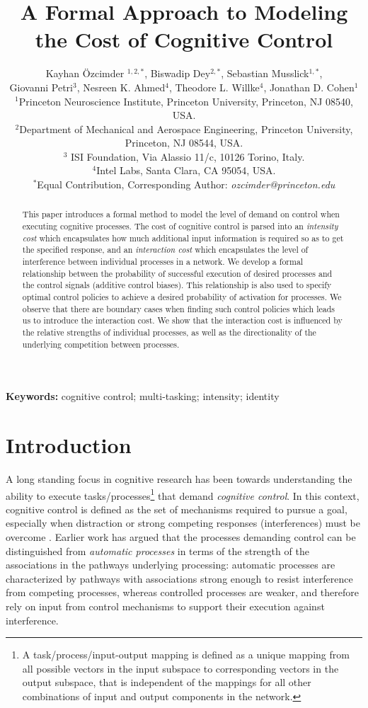 \documentclass[10pt,letterpaper]{article}
\title{A Formal Approach to Modeling the Cost of Cognitive Control}
\author{
Kayhan {\"O}zcimder $^{1,2,*}$, Biswadip Dey$^{2,*}$, Sebastian Musslick$^{1,*}$, \\ 
Giovanni Petri$^3$, Nesreen K. Ahmed$^4$, Theodore L. Willke$^4$, Jonathan D. Cohen$^1$ \\
  $^1$Princeton Neuroscience Institute, Princeton University, Princeton, NJ 08540, USA. \\
  $^2$Department of Mechanical and Aerospace Engineering, Princeton University, Princeton, NJ 08544, USA. \\
  $^3$ ISI Foundation, Via Alassio 11/c, 10126 Torino, Italy.\\
  $^4$Intel Labs, Santa Clara, CA 95054, USA.\\
  $^*$Equal Contribution, Corresponding Author: {\it ozcimder@princeton.edu}
}
\begin{document}
\maketitle

\begin{abstract}
This paper introduces a formal method to model the level of demand on control when executing cognitive processes. The cost of cognitive control is parsed into an \emph{intensity cost} which encapsulates how much additional input information is required so as to get the specified response, and an \emph{interaction cost} which encapsulates the level of interference between individual processes in a network. We develop a formal relationship between the probability of successful execution of desired processes and the control signals (additive control biases). This relationship is also used to specify optimal control policies to achieve a desired probability of activation for processes. We observe that there are boundary cases when finding such control policies which leads us to introduce the interaction cost. We show that the interaction cost is influenced by the relative strengths of individual processes, as well as the directionality of the underlying competition between processes.
\end{abstract}
{
\textbf{Keywords:} 
cognitive control; multi-tasking; intensity; identity
}
%
%
%

%
%
\section{Introduction}
\label{sec:Introduction}
%
A long standing focus in cognitive research has been towards understanding the ability to execute tasks/processes\footnote{A task/process/input-output mapping is defined as a unique mapping from all possible vectors in the input subspace to corresponding vectors in the output subspace, that is independent of the mappings for all other combinations of input and output components in the network.} that demand \emph{cognitive control}. In this context, cognitive control is defined as the set of mechanisms required to pursue a goal, especially when distraction or strong competing responses (interferences) must be overcome \cite{posnerr,shiffrin1977controlled,cohen1990control}. Earlier work \cite{posnerr, shiffrin1977controlled, cohen1990control, COGS:COGS12126} has argued that the processes demanding control can be distinguished from \emph{automatic processes} in terms of the strength of the associations in the pathways underlying processing: automatic processes are characterized by pathways with associations strong enough to resist interference from competing processes, whereas controlled processes are weaker, and therefore rely on input from control mechanisms to support their execution against interference.
\end{document}
